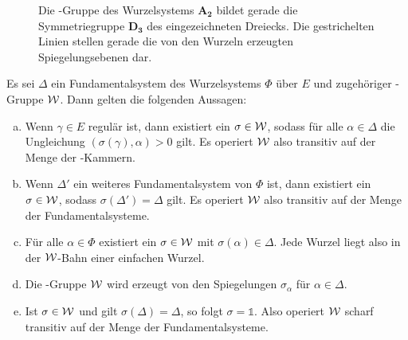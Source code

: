 \begin{figure}
  \centering
  \label{fig:symmetry}
  \caption{Die \weyl\hyp{}Gruppe des Wurzelsystems $\mathbf{A_2}$ bildet gerade die Symmetriegruppe $\mathbf{D_3}$ des eingezeichneten Dreiecks. Die gestrichelten Linien stellen gerade die von den Wurzeln erzeugten Spiegelungsebenen dar.}
\end{figure}

\begin{thm}
  \label{thm:simplyTransitive}
  Es sei $\Delta$ ein Fundamentalsystem des Wurzelsystems $\Phi$ über $E$ und zugehöriger \weyl\hyp{}Gruppe $\mathcal{W}$.
  Dann gelten die folgenden Aussagen:
  \begin{enumerate}[(a)]

    \item Wenn $\gamma \in E$ regulär ist, dann existiert ein $\sigma \in \mathcal{W}$, sodass für alle $\alpha \in \Delta$ die Ungleichung $(\sigma(\gamma), \alpha) > 0$ gilt. 
      Es operiert $\mathcal{W}$ also transitiv auf der Menge der \weyl\hyp{}Kammern.

    \item Wenn $\Delta'$ ein weiteres Fundamentalsystem von $\Phi$ ist, dann existiert ein $\sigma \in \mathcal{W}$, sodass $\sigma(\Delta') = \Delta$ gilt.
      Es operiert $\mathcal{W}$ also transitiv auf der Menge der Fundamentalsysteme.

    \item Für alle $\alpha \in \Phi$ existiert ein $\sigma \in \mathcal{W}$ mit $\sigma(\alpha) \in \Delta$.
      Jede Wurzel liegt also in der $\mathcal{W}$\hyp{}Bahn einer einfachen Wurzel.

    \item Die \weyl\hyp{}Gruppe $\mathcal{W}$ wird erzeugt von den Spiegelungen $\sigma_\alpha$ für $\alpha \in \Delta$.

    \item Ist $\sigma \in \mathcal{W}$ und gilt $\sigma(\Delta) = \Delta$, so folgt $\sigma = \mathds{1}$.
      Also operiert $\mathcal{W}$ scharf transitiv auf der Menge der Fundamentalsysteme.
  \end{enumerate}
\end{thm}

